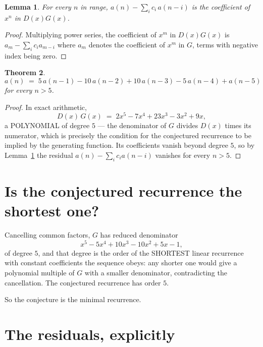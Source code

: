 \documentclass[11pt,a4paper]{article}
\theoremstyle{plain}
\newtheorem{theorem}{Theorem}
\newtheorem{lemma}[theorem]{Lemma}
\theoremstyle{definition}
\begin{document}
\begin{lemma}\label{lem:key}
For every $n$ in range, $a(n)-\sum_i c_i\,a(n-i)$ is the coefficient of $x^{n}$ in
$D(x)G(x)$.
\end{lemma}

\begin{proof}
Multiplying power series, the coefficient of $x^{m}$ in $D(x)G(x)$ is
$a_m-\sum_i c_i a_{m-i}$ where $a_m$ denotes the coefficient of $x^{m}$ in $G$, terms with
negative index being zero.
\end{proof}

\begin{theorem}
\[
a(n)\;=\;5\,a(n-1) - 10\,a(n-2) + 10\,a(n-3) - 5\,a(n-4) + a(n-5)
\]
for every $n>5$.
\end{theorem}

\begin{proof}
In exact arithmetic,
\[
D(x)\,G(x)\;=\;2 x^{5} - 7 x^{4} + 23 x^{3} - 3 x^{2} + 9 x,
\]
a POLYNOMIAL of degree $5$ --- the denominator of $G$ divides $D(x)$ times its numerator,
which is precisely the condition for the conjectured recurrence to be implied by the
generating function. Its coefficients vanish beyond degree $5$, so by
Lemma~\ref{lem:key} the residual $a(n)-\sum_ic_ia(n-i)$ vanishes for every
$n>5$.
\end{proof}

\section{Is the conjectured recurrence the shortest one?}

Cancelling common factors, $G$ has reduced denominator
\[
x^{5} - 5 x^{4} + 10 x^{3} - 10 x^{2} + 5 x - 1,
\]
of degree $5$, and that degree is the order of the SHORTEST linear recurrence with
constant coefficients the sequence obeys: any shorter one would give a polynomial multiple of
$G$ with a smaller denominator, contradicting the cancellation. The conjectured recurrence has
order $5$.

So the conjecture is the minimal recurrence.

\section{The residuals, explicitly}
\end{document}
